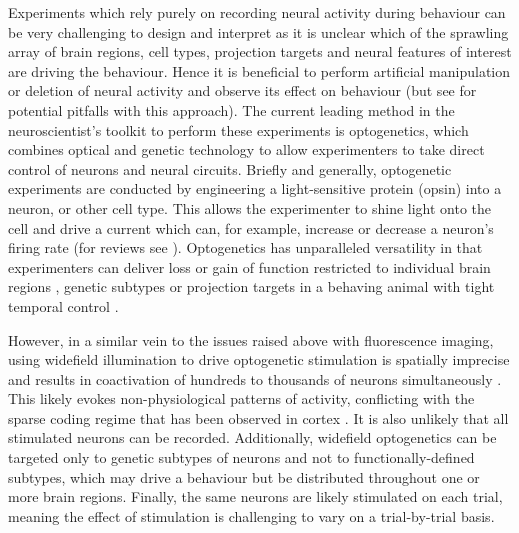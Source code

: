 Experiments which rely purely on recording neural activity during behaviour can be very challenging to design and interpret as it is unclear which of the sprawling array of brain regions, cell types, projection targets and neural features of interest are driving the behaviour. Hence it is beneficial to perform artificial manipulation or deletion of neural activity and observe its effect on behaviour (but see \cite{otchy_acute_2015} for potential pitfalls with this approach). The current leading method in the neuroscientist’s toolkit to perform these experiments is optogenetics, which combines optical and genetic technology to allow experimenters to take direct control of neurons and neural circuits. Briefly and generally, optogenetic experiments are conducted by engineering a light-sensitive protein (opsin) into a neuron, or other cell type. This allows the experimenter to shine light onto the cell and drive a current which can, for example, increase or decrease a neuron's firing rate (for reviews see \cite{miesenbock_optogenetic_2009, deisseroth_optogenetics_2011}). Optogenetics has unparalleled versatility in that experimenters can deliver loss or gain of function restricted to individual brain regions \cite{zhang_optogenetic_2010}, genetic subtypes \cite{cardin_driving_2009, tye_dopamine_2013, zalocusky_nucleus_2016} or projection targets \cite{mattis_frequency-dependent_2014} in a behaving animal \cite{tye_amygdala_2011} with tight temporal control \cite{krook-magnuson_-demand_2013}. 

However, in a similar vein to the issues raised above with fluorescence imaging, using widefield illumination to drive optogenetic stimulation is spatially imprecise and results in coactivation of hundreds to thousands of neurons simultaneously \cite{huber_sparse_2008}. This likely evokes non-physiological patterns of activity, conflicting with the sparse coding regime that has been observed in cortex \cite{olshausen_sparse_2004}. It is also unlikely that all stimulated neurons can be recorded. Additionally, widefield optogenetics can be targeted only to genetic subtypes of neurons and not to functionally-defined subtypes, which may drive a behaviour but be distributed throughout one or more brain regions.  Finally, the same neurons are likely stimulated on each trial, meaning the effect of stimulation is challenging to vary on a trial-by-trial basis.

